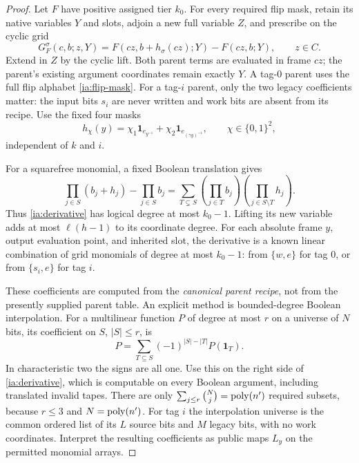 \begin{proof}
Let $F$ have positive assigned tier $k_0$.  For every required flip
mask, retain its native variables $Y$ and slots, adjoin a new full
variable $Z$, and prescribe on the cyclic grid
\begin{equation}
 G_F^\sigma(c,b;z,Y)
   =F(cz,b+h_\sigma(cz);Y)-F(cz,b;Y),\qquad z\in C.
                                                               \label{ia:derivative}
\end{equation}
Extend in $Z$ by the cyclic lift.  Both parent terms are evaluated
in frame $cz$; the parent's existing argument coordinates remain
exactly $Y$.  A tag-$0$ parent uses the full flip alphabet
\eqref{ia:flip-mask}.  For a tag-$i$ parent, only the two legacy
coefficients matter: the input bits $s_i$ are never written and
work bits are absent from its recipe.  Use the fixed four masks
\begin{equation}
 h_\chi(y)=\chi_1\mathbf 1_{e_{y^{-1}}}
            +\chi_2\mathbf 1_{e_{(\gamma y)^{-1}}},
 \qquad \chi\in\{0,1\}^2,                        \label{ia:port-flip-mask}
\end{equation}
independent of $k$ and $i$.

For a squarefree monomial, a fixed Boolean translation gives
\begin{equation}
 \prod_{j\in S}(b_j+h_j)-\prod_{j\in S}b_j
   =\sum_{T\subsetneq S}\left(\prod_{j\in T}b_j\right)
                         \left(\prod_{j\in S\setminus T}h_j\right).
                                                               \label{ia:degree-drop}
\end{equation}
Thus \eqref{ia:derivative} has logical degree at most $k_0-1$.
Lifting its new variable adds at most $\ell(h-1)$ to its coordinate
degree.  For each absolute frame $y$, output evaluation point, and
inherited slot, the derivative is a known linear combination of
grid monomials of degree at most $k_0-1$: from $\{w,e\}$ for tag
$0$, or from $\{s_i,e\}$ for tag $i$.

These coefficients are computed from the \emph{canonical parent
recipe}, not from the presently supplied parent table.  An explicit
method is bounded-degree Boolean interpolation.  For a multilinear
function $P$ of degree at most $r$ on a universe of $N$ bits, its
coefficient on $S$, $|S|\le r$, is
\begin{equation}
 [b_S]P=\sum_{T\subseteq S}(-1)^{|S|-|T|}P(\mathbf 1_T).
                                                               \label{ia:boolean-inversion}
\end{equation}
In characteristic two the signs are all one.  Use this on the
right side of \eqref{ia:derivative}, which is computable on every
Boolean argument, including translated invalid tapes.  There are
only $\sum_{j\le r}\binom Nj=\operatorname{poly}(n')$ required subsets, because
$r\le3$ and $N=\operatorname{poly}(n')$.  For tag $i$ the interpolation universe
is the common ordered list of its $L$ source bits and $M$ legacy
bits, with no work coordinates.  Interpret the resulting coefficients
as public maps $L_y$ on the permitted monomial arrays.


\end{proof}
